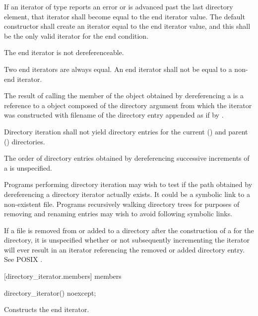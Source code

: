 \pnum
If an iterator of type  reports an error or
is advanced past the last directory element,
that iterator shall become equal to the end iterator
value. The  default constructor shall
create an iterator equal to the end iterator value, and this shall be the only
valid iterator for the end condition.

\pnum
The end iterator is not dereferenceable.

\pnum
Two end iterators are always equal. An end iterator shall not be equal to a non-end
iterator.

\pnum
The result of calling the  member of the  object obtained by dereferencing a  is a reference to a  object composed of the directory argument from which the iterator was
constructed with filename of the directory entry appended as if by .

\pnum
Directory iteration shall not yield directory entries for the current ()
and parent () directories.

\pnum
The order of directory entries obtained by dereferencing successive
increments of a  is unspecified.

\pnum
\begin{note}
Programs performing directory iteration may wish to test if the
path obtained by dereferencing a directory iterator actually exists. It could be
a symbolic link to a non-existent file. Programs recursively
walking directory trees for purposes of removing and renaming entries may wish
to avoid following symbolic links.

\pnum
If a file  is removed from or added to a directory after the
construction of a  for the directory, it is
unspecified whether or not subsequently incrementing the iterator will ever
result in an iterator referencing the removed or added directory entry. See
POSIX .
\end{note}

[directory_iterator.members]{ members}

\begin{itemdecl}
directory_iterator() noexcept;
\end{itemdecl}

\begin{itemdescr}
\pnum
\effects Constructs the end iterator.
\end{itemdescr}

